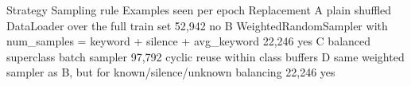 Strategy	Sampling rule	Examples seen per epoch	Replacement
A	plain shuffled DataLoader over the full train set	52,942	no
B	WeightedRandomSampler with num_samples = keyword + silence + avg_keyword	22,246	yes
C	balanced superclass batch sampler	97,792	cyclic reuse within class buffers
D	same weighted sampler as B, but for known/silence/unknown balancing	22,246	yes
